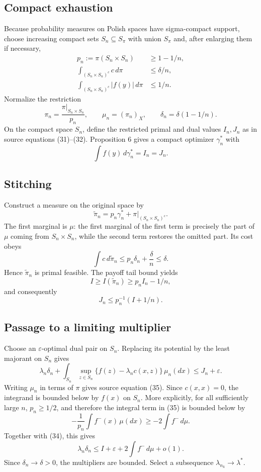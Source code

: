 \subsection{Compact exhaustion}
Because probability measures on Polish spaces have sigma-compact support, choose increasing compact
sets $S_n\subseteq S_\pi$ with union $S_\pi$ and, after enlarging them if necessary,
\begin{align}
 p_n:=\pi(S_n\times S_n)&\ge1-1/n, \tag{30a}\\
 \int_{(S_n\times S_n)^c}c\,d\pi&\le\delta/n, \tag{30b}\\
 \int_{(S_n\times S_n)^c}|f(y)|\,d\pi&\le1/n. \tag{30c}
\end{align}
Normalize the restriction
\[
 \pi_n=\frac{\pi|_{S_n\times S_n}}{p_n},
 \qquad \mu_n=(\pi_n)_X,
 \qquad \delta_n=\delta(1-1/n).
\]
On the compact space $S_n$, define the restricted primal and dual values $I_n,J_n$ as in source
equations (31)--(32).  Proposition 6 gives a compact optimizer $\gamma_n^*$ with
\begin{equation}
 \int f(y)\,d\gamma_n^*=I_n=J_n. \tag{33}
\end{equation}

\subsection{Stitching}
Construct a measure on the original space by
\[
 \widetilde\pi_n
 =p_n\gamma_n^*+\pi|_{(S_n\times S_n)^c}.
\]
The first marginal is $\mu$: the first marginal of the first term is precisely the part of $\mu$
coming from $S_n\times S_n$, while the second term restores the omitted part.  Its cost obeys
\[
 \int c\,d\widetilde\pi_n
 \le p_n\delta_n+\frac{\delta}{n}\le\delta.
\]
Hence $\widetilde\pi_n$ is primal feasible.  The payoff tail bound yields
\[
 I\ge I(\widetilde\pi_n)\ge p_n I_n-1/n,
\]
and consequently
\begin{equation}
 J_n\le p_n^{-1}(I+1/n). \tag{34}
\end{equation}

\subsection{Passage to a limiting multiplier}
Choose an $\varepsilon$-optimal dual pair on $S_n$.  Replacing its potential by the least majorant
on $S_n$ gives
\[
 \lambda_n\delta_n+
 \int_{S_n}\sup_{z\in S_n}\{f(z)-\lambda_n c(x,z)\}\,\mu_n(dx)
 \le J_n+\varepsilon.
\]
Writing $\mu_n$ in terms of $\pi$ gives source equation (35).  Since $c(x,x)=0$, the integrand is bounded below by $f(x)$ on $S_n$.  More explicitly,
for all sufficiently large $n$, $p_n\ge1/2$, and therefore the integral term in (35) is bounded
below by
\[
 -\frac1{p_n}\int f^-(x)\,\mu(dx)
 \ge -2\int f^-\,d\mu.
\]
Together with (34), this gives
\[
 \lambda_n\delta_n
 \le I+\varepsilon+2\int f^-\,d\mu+o(1).
\]
Since $\delta_n\to\delta>0$, the multipliers are bounded.  Select a subsequence
$\lambda_{n_k}\to\lambda^*$.

